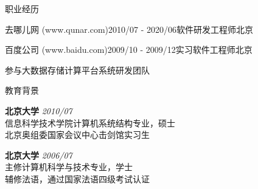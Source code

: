 \documentclass{resume} %
\begin{document}
\begin{rSection}{职业经历}
\begin{rSubsection}{去哪儿网 (www.qunar.com)}{2010/07 - 2020/06}{软件研发工程师}{北京}
  \end{rSubsection}


  \begin{rSubsection}{百度公司 (www.baidu.com)}{2009/10 - 2009/12}{实习软件工程师}{北京}
  \item 参与大数据存储计算平台系统研发团队
  \end{rSubsection}

\end{rSection}



\begin{rSection}{教育背景}

  {\bf 北京大学} \hfill {\em 2010/07} \\ 
  信息科学技术学院计算机系统结构专业，硕士 \\
  北京奥组委国家会议中心击剑馆实习生

  {\bf 北京大学} \hfill {\em 2006/07} \\ 
  主修计算机科学与技术专业，学士 \\
  辅修法语，通过国家法语四级考试认证

\end{rSection}






\end{document}
